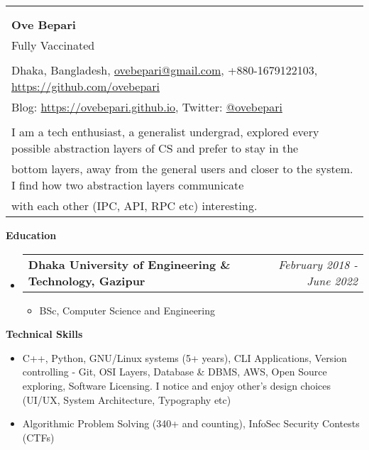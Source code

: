\documentclass[legalpaper,10pt]{article}
\makeatletter
\newcommand{\resheading}[1]{{\large \colorbox{mygrey}{\begin{minipage}{\textwidth}{\textbf{#1 \vphantom{p\^{E}}}}\end{minipage}}}}
\newcommand{\ressubheading}[4]{
	\begin{tabular*}{7.1in}{l@{\extracolsep{\fill}}r}
		\textbf{#1} & \textit{#4} \\
	\end{tabular*}\vspace{-6pt}}
\makeatother
\begin{document}
	\begin{tabular*}{7.5in}{l@{\extracolsep{\fill}}}
		\\
		\\
		\\
		\textbf{\large Ove Bepari}\\
		{\scriptsize Fully Vaccinated}
		\\
		\\
		Dhaka, Bangladesh, \href{mailto:ovebepari@gmail.com}{ovebepari@gmail.com}, +880-1679122103, \url{https://github.com/ovebepari} \\
		 Blog: \url{https://ovebepari.github.io}, Twitter: \href{https://twitter.com/ovebepari}{@ovebepari}
		\\
		\\
		I am a tech enthusiast, a generalist undergrad, explored every possible abstraction layers of CS and prefer to stay in the\\bottom layers, away from the general users and closer to the system. I find how two abstraction layers communicate\\with each other (IPC, API, RPC etc) interesting.
	\end{tabular*}
	
	\vspace{0.25in}
	
	\resheading{Education}
	\begin{itemize}
	
		\item \ressubheading{Dhaka University of Engineering \& Technology, Gazipur}{}{}{February 2018 - June 2022}
		\begin{itemize}
			\item BSc, Computer Science and Engineering
		\end{itemize}
	
	\end{itemize}
	
	\vspace{0.20in}
	
	\resheading{Technical Skills}
	\begin{itemize}
		\item C++, Python, GNU/Linux systems (5+ years), CLI Applications, Version controlling - Git, OSI Layers, Database \& DBMS, AWS, Open Source exploring, Software Licensing. I notice and enjoy other's design choices (UI/UX, System Architecture, Typography etc)
		\item Algorithmic Problem Solving (340+ and counting), InfoSec Security Contests (CTFs)
	\end{itemize}
\end{document}
